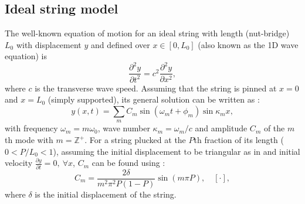 \documentclass{article}
\begin{document}
\begin{sloppy}
%
%
%
%
%
%
%
%
%
%
%
%
%
% 

\section{Ideal string model}
The well-known equation of motion for an ideal string with length (nut-bridge) $L_0$ with displacement $y$ and defined over $x \in [0, L_0]$ (also known as the 1D wave equation) is
\begin{equation}
\frac{\partial^2y}{\partial t^2} = c^2\frac{\partial^2y}{\partial x^2},
\end{equation}
where $c$ is the transverse wave speed. Assuming that the string is pinned at $x=0$ and $x=L_0$ (simply supported), its general solution can be written as \cite{fletcher:physics_of_musical_instruments}:
\begin{equation}\label{eq:modalSum}
    y(x,t) = \sum_m C_m\sin(\omega_mt+\phi_m)\sin\kappa_mx,
\end{equation}
with frequency $\omega_m = m\omega_0$, wave number $\kappa_m = \omega_m / c$ and amplitude $C_m$ of the $m$th mode with $m = \mathbb{Z}^+$. For a string plucked at the $P$th fraction of its length ($0<P/L_0<1$), assuming the initial displacement to be triangular as in \cite{fletcher:physics_of_musical_instruments} and initial velocity $\frac{\partial y}{\partial t} = 0, \ \forall x$, $C_m$ can be found using \cite{donkin:acoustics}:
\begin{equation}
    C_m = \frac{2\delta}{m^2\pi^2P(1-P)}\sin(m\pi P), \quad [\cdot],
\end{equation}
where $\delta$ is the initial displacement of the string.

\end{sloppy}
\end{document}
